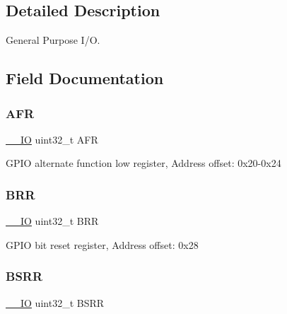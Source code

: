 \subsection{Detailed Description}
General Purpose I/O. 

\subsection{Field Documentation}
\mbox{\label{struct_g_p_i_o___type_def_a7100354be30ab2f2248e2c3e94ace993}} 
\subsubsection{\texorpdfstring{A\+FR}{AFR}}
{\footnotesize\ttfamily \hyperlink{core__sc300_8h_aec43007d9998a0a0e01faede4133d6be}{\+\_\+\+\_\+\+IO} uint32\+\_\+t A\+FR}

G\+P\+IO alternate function low register, Address offset\+: 0x20-\/0x24 \mbox{\label{struct_g_p_i_o___type_def_a092e59d908b2ca112e31047e942340cb}} 
\subsubsection{\texorpdfstring{B\+RR}{BRR}}
{\footnotesize\ttfamily \hyperlink{core__sc300_8h_aec43007d9998a0a0e01faede4133d6be}{\+\_\+\+\_\+\+IO} uint32\+\_\+t B\+RR}

G\+P\+IO bit reset register, Address offset\+: 0x28 \mbox{\label{struct_g_p_i_o___type_def_ac25dd6b9e3d55e17589195b461c5ec80}} 
\subsubsection{\texorpdfstring{B\+S\+RR}{BSRR}}
{\footnotesize\ttfamily \hyperlink{core__sc300_8h_aec43007d9998a0a0e01faede4133d6be}{\+\_\+\+\_\+\+IO} uint32\+\_\+t B\+S\+RR}

